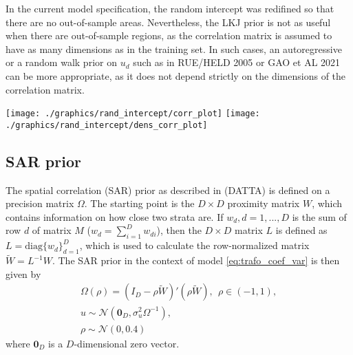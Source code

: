 In the current model specification, the random intercept was redifined so that there are no out-of-sample areas.
Nevertheless, the LKJ prior is not as useful when there are out-of-sample regions, as the correlation matrix is assumed to have as many dimensions as in the training set.
In such cases, an autoregressive or a random walk prior on $u_d$ such as in RUE/HELD 2005 or GAO et AL 2021 can be more appropriate, as it does not depend strictly on the dimensions of the correlation matrix.


\texttt{[image: ./graphics/rand\_intercept/corr\_plot]}
\texttt{[image: ./graphics/rand\_intercept/dens\_corr\_plot]}

\subsection{SAR prior}
The spatial correlation (SAR) prior as described in (DATTA) is defined on a precision matrix $\Omega$.
The starting point is the $D\times D$ proximity matrix $W$, which contains information on how close two strata are.
If $w_d, d = 1, ..., D$ is the sum of row $d$ of matrix $M$ ($w_d = \displaystyle \sum_{i = 1}^D w_{di}$), then the $D \times D$ matrix $L$ is defined as $L = \text{diag}\{w_d\}_{d=1}^D$, which is used to calculate the row-normalized matrix $\tilde W = L^{-1}W$.
The SAR prior in the context of model \ref{eq:trafo_coef_var} is then given by
\begin{gather*}
    \Omega(\rho) = (I_D - \rho \tilde W)'(\rho \tilde W), ~~ \rho \in (-1, 1),\\
    u \sim \mathcal N(\boldsymbol{0}_D, \sigma_u^2 \Omega^{-1}),\\
    \rho \sim \mathcal N(0, 0.4)
\end{gather*}
where $\boldsymbol{0}_D$ is a $D$-dimensional zero vector.







